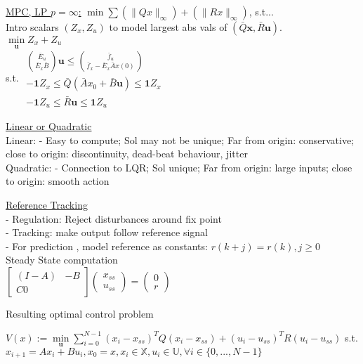 \documentclass[10pt,parskip]{scrartcl}
\begin{document}
\begin{multicols*}{3}
\underline{MPC, LP $p = \infty$:}  $\min \sum (\|Qx\|_\infty) +(\|Rx\|_\infty)$, s.t...\\
Intro scalars $(Z_x,Z_u)$ to model largest abs vals of $(\bar Q\mathbf x, \bar R\mathbf u)$.\\
\hspace*{8mm}$\min\limits_{\mathbf u}  Z_x + Z_u$\\
\hspace*{8mm} s.t. 
$\left. \begin{matrix}
\binom{\bar E_u}{\bar E_x \bar B} \mathbf u \leq \binom{\bar f_u}{\bar f_x - \bar E_x \bar A x(0)} \\
-\mathbf 1 Z_x \leq \bar Q ( \bar A x_0 + \bar B \mathbf u) \leq \mathbf 1 Z_x\\
-\mathbf 1 Z_u \leq \bar R \mathbf u \leq \mathbf 1 Z_u
\end{matrix} \right .$


\underline{Linear or Quadratic}\\
Linear: - Easy to compute; Sol may not be unique; Far from origin: conservative; close to origin: discontinuity, dead-beat behaviour, jitter\\
Quadratic: - Connection to LQR; Sol unique; Far from origin: large inputs; close to origin: smooth action

\underline{Reference Tracking}\\
- Regulation: Reject disturbances around fix point\\
- Tracking: make output follow reference signal\\
- For prediction , model reference as constants: $ r(k+j) = r(k), j \geq 0$\\
Steady State computation\\
$\begin{bmatrix}
 (I-A) & -B\\
 C 0
\end{bmatrix}
\begin{pmatrix}
 x_{ss}\\
 u_{ss}
\end{pmatrix}
= 
\begin{pmatrix}
 0 \\
 r
\end{pmatrix}$

Resulting optimal control problem

$ V(x) := \min \limits_{\mathbf u} 	\sum\nolimits_{i=0}^{N-1} (x_i-x_{ss})^T Q (x_i-x_{ss}) + (u_i-u_{ss})^T R (u_i-u_{ss})$
s.t. $x_{i+1} = A x_i + B u_i, x_0 = x, x_i \in \mathbb X, u_i \in \mathbb U, \forall i \in \{0, ..., N-1\}$


\end{multicols*}
\end{document}
